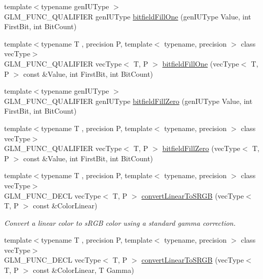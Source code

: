 \begin{DoxyCompactItemize}
\item 
{\footnotesize template$<$typename gen\+I\+U\+Type $>$ }\\G\+L\+M\+\_\+\+F\+U\+N\+C\+\_\+\+Q\+U\+A\+L\+I\+F\+I\+E\+R gen\+I\+U\+Type \hyperlink{group__gtc__bitfield_ga46f9295abe3b5c7658f5b13c7f819f0a}{bitfield\+Fill\+One} (gen\+I\+U\+Type Value, int First\+Bit, int Bit\+Count)
\item 
{\footnotesize template$<$typename T , precision P, template$<$ typename, precision $>$ class vec\+Type$>$ }\\G\+L\+M\+\_\+\+F\+U\+N\+C\+\_\+\+Q\+U\+A\+L\+I\+F\+I\+E\+R vec\+Type$<$ T, P $>$ \hyperlink{group__gtc__bitfield_gad789042e84e8292ae95dc1af856f2ad5}{bitfield\+Fill\+One} (vec\+Type$<$ T, P $>$ const \&Value, int First\+Bit, int Bit\+Count)
\item 
{\footnotesize template$<$typename gen\+I\+U\+Type $>$ }\\G\+L\+M\+\_\+\+F\+U\+N\+C\+\_\+\+Q\+U\+A\+L\+I\+F\+I\+E\+R gen\+I\+U\+Type \hyperlink{group__gtc__bitfield_ga697b86998b7d74ee0a69d8e9f8819fee}{bitfield\+Fill\+Zero} (gen\+I\+U\+Type Value, int First\+Bit, int Bit\+Count)
\item 
{\footnotesize template$<$typename T , precision P, template$<$ typename, precision $>$ class vec\+Type$>$ }\\G\+L\+M\+\_\+\+F\+U\+N\+C\+\_\+\+Q\+U\+A\+L\+I\+F\+I\+E\+R vec\+Type$<$ T, P $>$ \hyperlink{group__gtc__bitfield_gaddba3196316b0bd240295b09b43c2958}{bitfield\+Fill\+Zero} (vec\+Type$<$ T, P $>$ const \&Value, int First\+Bit, int Bit\+Count)
\item 
{\footnotesize template$<$typename T , precision P, template$<$ typename, precision $>$ class vec\+Type$>$ }\\G\+L\+M\+\_\+\+F\+U\+N\+C\+\_\+\+D\+E\+C\+L vec\+Type$<$ T, P $>$ \hyperlink{group__gtc__color__space_gad813dcd99644cafc775e83d6504ccb93}{convert\+Linear\+To\+S\+R\+G\+B} (vec\+Type$<$ T, P $>$ const \&Color\+Linear)
\begin{DoxyCompactList}\small\item\em Convert a linear color to s\+R\+G\+B color using a standard gamma correction. \end{DoxyCompactList}\item 
{\footnotesize template$<$typename T , precision P, template$<$ typename, precision $>$ class vec\+Type$>$ }\\G\+L\+M\+\_\+\+F\+U\+N\+C\+\_\+\+D\+E\+C\+L vec\+Type$<$ T, P $>$ \hyperlink{group__gtc__color__space_ga63f8b003da7acf44370eb47bfb8b3d42}{convert\+Linear\+To\+S\+R\+G\+B} (vec\+Type$<$ T, P $>$ const \&Color\+Linear, T Gamma)

\end{DoxyCompactItemize}
